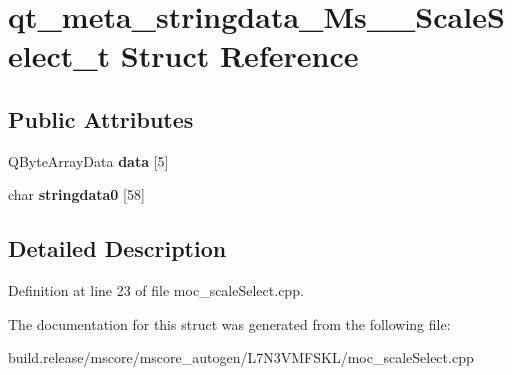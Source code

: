 \hypertarget{structqt__meta__stringdata___ms_____scale_select__t}{}\section{qt\+\_\+meta\+\_\+stringdata\+\_\+\+Ms\+\_\+\+\_\+\+Scale\+Select\+\_\+t Struct Reference}
\label{structqt__meta__stringdata___ms_____scale_select__t}
\subsection*{Public Attributes}
\begin{DoxyCompactItemize}
\item 
\mbox{\label{structqt__meta__stringdata___ms_____scale_select__t_a7ac0cf6b4430cf5bacb03bf8d86c6cad}} 
Q\+Byte\+Array\+Data {\bfseries data} \mbox{[}5\mbox{]}
\item 
\mbox{\label{structqt__meta__stringdata___ms_____scale_select__t_ae4f17d47f2da480d6563320fb31d5571}} 
char {\bfseries stringdata0} \mbox{[}58\mbox{]}
\end{DoxyCompactItemize}


\subsection{Detailed Description}


Definition at line 23 of file moc\+\_\+scale\+Select.\+cpp.



The documentation for this struct was generated from the following file\+:\begin{DoxyCompactItemize}
\item 
build.\+release/mscore/mscore\+\_\+autogen/\+L7\+N3\+V\+M\+F\+S\+K\+L/moc\+\_\+scale\+Select.\+cpp\end{DoxyCompactItemize}
